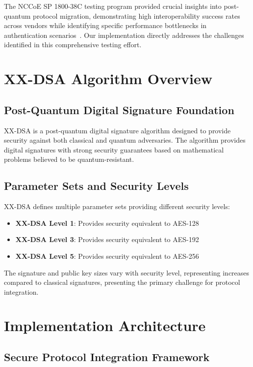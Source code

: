 \documentclass[journal=tches,final]{iacrtrans}
\begin{document}
The NCCoE SP 1800-38C testing program provided crucial insights into post-quantum protocol migration, demonstrating high interoperability success rates across vendors while identifying specific performance bottlenecks in authentication scenarios~\cite{NCCoE2023}. Our implementation directly addresses the challenges identified in this comprehensive testing effort.

\section{XX-DSA Algorithm Overview}

\subsection{Post-Quantum Digital Signature Foundation}

XX-DSA is a post-quantum digital signature algorithm designed to provide security against both classical and quantum adversaries. The algorithm provides digital signatures with strong security guarantees based on mathematical problems believed to be quantum-resistant.

\subsection{Parameter Sets and Security Levels}

XX-DSA defines multiple parameter sets providing different security levels:
\begin{itemize}
    \item \textbf{XX-DSA Level 1}: Provides security equivalent to AES-128
    \item \textbf{XX-DSA Level 3}: Provides security equivalent to AES-192  
    \item \textbf{XX-DSA Level 5}: Provides security equivalent to AES-256
\end{itemize}

The signature and public key sizes vary with security level, representing increases compared to classical signatures, presenting the primary challenge for protocol integration.

\section{Implementation Architecture}

\subsection{Secure Protocol Integration Framework}
\end{document}

